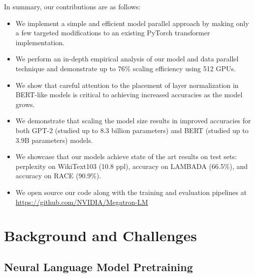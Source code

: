 In summary, our contributions are as follows:

\begin{itemize}
    \item We implement a simple and efficient model parallel approach by making only a few targeted modifications to an existing PyTorch transformer implementation.
    \item We perform an in-depth empirical analysis of our model and data parallel technique and demonstrate up to 76\% scaling efficiency using 512 GPUs.
    \item We show that careful attention to the placement of layer normalization in BERT-like models is critical to achieving increased accuracies as the model grows.
    \item We demonstrate that scaling the model size results in improved accuracies for both GPT-2 (studied up to 8.3 billion parameters) and BERT (studied up to 3.9B parameters) models.
    \item We showcase that our models achieve state of the art results on test sets: perplexity on WikiText103 (10.8 ppl), accuracy on LAMBADA (66.5\%), and accuracy on RACE (90.9\%).
    \item We open source our code along with the training and evaluation pipelines at \url{https://github.com/NVIDIA/Megatron-LM}
\end{itemize}

\section{Background and Challenges}
\subsection{Neural Language Model Pretraining} 


